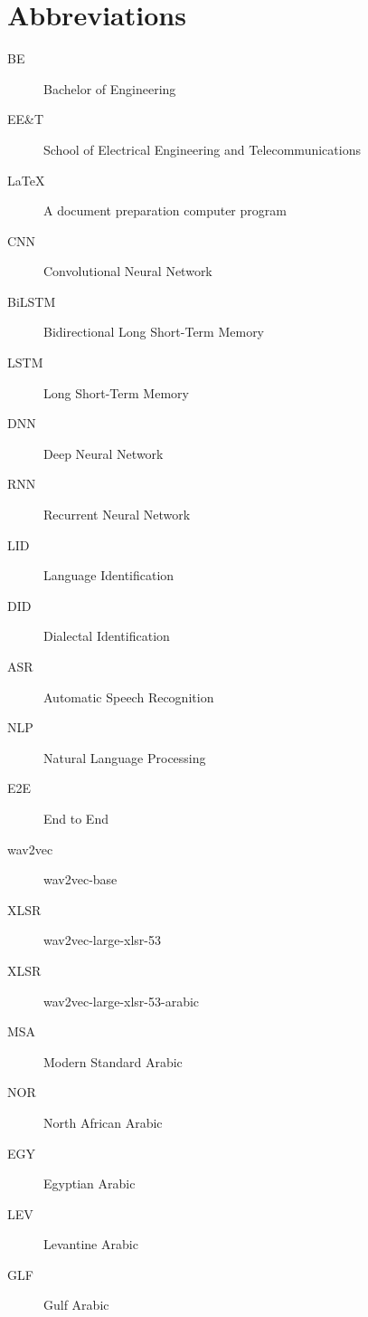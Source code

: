 \chapter*{Abbreviations}\label{abbr}
\begin{description}
\item[BE] Bachelor of Engineering
\item[EE\&T] School of Electrical Engineering and Telecommunications
\item[\LaTeX] A document preparation computer program
\item[CNN] Convolutional Neural Network
\item[BiLSTM] Bidirectional Long Short-Term Memory
\item[LSTM] Long Short-Term Memory
\item[DNN] Deep Neural Network
\item[RNN] Recurrent Neural Network
\item[LID] Language Identification
\item[DID] Dialectal Identification  
\item[ASR] Automatic Speech Recognition
\item[NLP] Natural Language Processing 
\item[E2E] End to End
\item[wav2vec] wav2vec-base
\item[XLSR] wav2vec-large-xlsr-53
\item[XLSR] wav2vec-large-xlsr-53-arabic  
\item[MSA] Modern Standard Arabic 
\item[NOR] North African Arabic
\item[EGY] Egyptian Arabic
\item[LEV] Levantine Arabic 
\item[GLF] Gulf Arabic  
\end{description}
